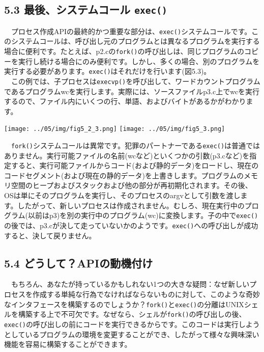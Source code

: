 \hypertarget{ux6700ux5f8cux30b7ux30b9ux30c6ux30e0ux30b3ux30fcux30eb-exec}{%
\subsection*{\texorpdfstring{5.3 最後、システムコール
\texttt{exec()}}{5.3 最後、システムコール exec()}}\label{ux6700ux5f8cux30b7ux30b9ux30c6ux30e0ux30b3ux30fcux30eb-exec}}

　プロセス作成APIの最終的かつ重要な部分は、\texttt{exec()}システムコールです。このシステムコールは、呼び出し元のプログラムとは異なるプログラムを実行する場合に便利です。たとえば、p2.cの\texttt{fork()}の呼び出しは、同じプログラムのコピーを実行し続ける場合にのみ便利です。しかし、多くの場合、別のプログラムを実行する必要があります。\texttt{exec()}はそれだけを行います(図5.3)。\\
　この例では、子プロセスは\texttt{execvp()}を呼び出して、ワードカウントプログラムであるプログラムwcを実行します。実際には、ソースファイルp3.c上でwcを実行するので、ファイル内にいくつの行、単語、およびバイトがあるかがわかります。

\texttt{[image: ../05/img/fig5\_2\_3.png]}
\texttt{[image: ../05/img/fig5\_3.png]}

　\texttt{fork()}システムコールは異常です。犯罪のパートナーである\texttt{exec()}は普通ではありません。実行可能ファイルの名前(wcなど)といくつかの引数(p3.cなど)を指定すると、実行可能ファイルからコード(および静的データ)をロードし、現在のコードセグメント(および現在の静的データ)を上書きします。プログラムのメモリ空間のヒープおよびスタックおよび他の部分が再初期化されます。その後、OSは単にそのプログラムを実行し、そのプロセスのargvとして引数を渡します。したがって、新しいプロセスは作成されません。むしろ、現在実行中のプログラム(以前はp3)を別の実行中のプログラム(wc)に変換します。子の中で\texttt{exec()}の後では、p3.cが決して走っていないかのようです。\texttt{exec()}への呼び出しが成功すると、決して戻りません。

\hypertarget{ux3069ux3046ux3057ux3066apiux306eux52d5ux6a5fux4ed8ux3051}{%
\subsection*{5.4
どうして？APIの動機付け}\label{ux3069ux3046ux3057ux3066apiux306eux52d5ux6a5fux4ed8ux3051}}

　もちろん、あなたが持っているかもしれない1つの大きな疑問：なぜ新しいプロセスを作成する単純な行為でなければならないものに対して、このような奇妙なインタフェースを構築するのでしょうか？\texttt{fork()}と\texttt{exec()}の分離はUNIXシェルを構築する上で不可欠です。なぜなら、シェルが\texttt{fork()}の呼び出しの後、\texttt{exec()}の呼び出しの前にコードを実行できるからです。このコードは実行しようとしているプログラムの環境を変更することができ、したがって様々な興味深い機能を容易に構築することができます。

